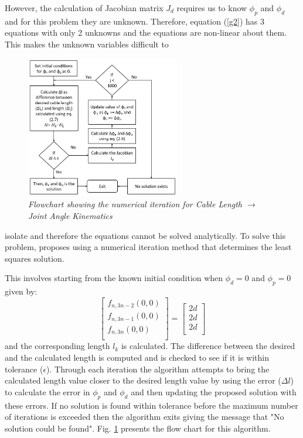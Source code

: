 \documentclass[a4paper,12pt]{report}
\begin{document}
However, the calculation of Jacobian matrix $J_{d}$ requires us to know $\phi_{p}$ and $\phi_{d}$ and for this problem they are unknown. Therefore, equation (\ref{g2}) has 3 equations with only 2 unknowns and the equations are non-linear about them. This makes the unknown variables difficult to
\begin{figure}
	\centering
	\vspace{-15pt}
	\includegraphics[width=0.6\textwidth]{images/Iteration_1.png}
	\caption{\textit{Flowchart showing the numerical iteration for Cable Length $\longrightarrow$ Joint Angle Kinematics}}
	\vspace{-40pt}
	\label{iteration-1}
\end{figure}
isolate and therefore the equations cannot be solved analytically. To solve this problem, \cite{RN30} proposes using a numerical iteration method that determines the least squares solution. 

This involves starting from the known initial condition when $\phi_{d}=0$ and $\phi_{p}=0$ given by:
\begin{equation*}
\begin{bmatrix}
f_{n,3n-2}(0,0)\\
f_{n,3n-1}(0,0)\\
f_{n,3n}(0,0)\\
\end{bmatrix} =
\begin{bmatrix}
2d\\
2d\\
2d\\
\end{bmatrix}
\label{initial-condition-iteration-1}
\end{equation*}
and the corresponding length $l_{k}$ is calculated. The difference between the desired and the calculated length is computed and is checked to see if it is within tolerance ($\epsilon$). Through each iteration the algorithm attempts to bring the calculated length value closer to the desired length value by using the error ($\Delta l$) to calculate the error in $\phi_p$ and $\phi_d$ and then updating the proposed solution with these errors. If no solution is found within tolerance before the maximum number of iterations is exceeded then the algorithm exits giving the message that "No solution could be found". Fig. \ref{iteration-1} presents the flow chart for this algorithm.
\end{document}
